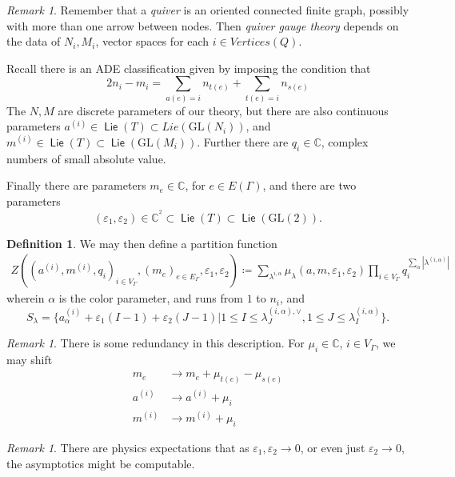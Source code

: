 \documentclass[leqno, openany]{memoir}
\theoremstyle{definition}
\newtheorem{defn}[thm]{Definition}
\theoremstyle{remark}
\newtheorem{rmk}[thm]{Remark}
\theoremstyle{plain}
\theoremstyle{definition}
\theoremstyle{remark}
\newcommand{\ep}{\varepsilon}
\newcommand{\mr}[1]{\mathrm{#1}}
\newcommand{\ms}[1]{\mathsf{#1}}
\newcommand{\GL}{\mr{GL}}
\DeclareMathOperator{\Lie}{\ms{Lie}}
\begin{document}
\begin{rmk}
Remember that a \emph{quiver} is an oriented connected finite graph, possibly with more than one arrow between nodes. 
Then \emph{quiver gauge theory} depends on the data of $N_i, M_i$, vector spaces for each $i \in Vertices(Q)$.

Recall there is an ADE classification given by imposing the condition that 
\[
2n_i - m_i = \sum_{a(e) = i} n_{t(e)} + \sum_{t(e) = i} n_{s(e)}
\]
The $N,M$ are discrete parameters of our theory, but there are also 
continuous parameters $a^{(i)} \in \Lie(T) \subset Lie(\GL(N_i))$,
and $m^{(i)} \in \Lie(T) \subset \Lie(\GL(M_i))$. 
Further there are $q_i \in \mathbb{C}$, complex numbers of small absolute value.

Finally there are parameters $m_e \in \mathbb{C}$, for $e \in E(\Gamma)$, and there are two parameters
\[
(\ep_1,\ep_2)\in \mathbb{C}^^2 \subset \Lie(T) \subset \Lie(\GL(2)).
\]
\end{rmk}

\begin{defn}
We may then define a partition function 
\begin{align*}
Z((a^{(i)},m^{(i)}, q_i)_{i \in V_\Gamma}, (m_e)_{e \in E_\Gamma},\ep_1,\ep_2) \coloneqq \sum_{\lambda^{i,\alpha}} \mu_\lambda(a,m,\ep_1,\ep_2) \prod_{i \in V_\Gamma} q_i^{\sum_\alpha |\lambda^{(i,\alpha)}|}
\end{align*}
wherein $\alpha$ is the color parameter, and runs from $1$ to $n_i$,
and 
\[
S_{\lambda} = \{ a_\alpha^{(i)} + \ep_1(I -1) + \ep_2(J-1) | 1 \leq I \leq \lambda_J^{(i,\alpha),\vee}, 1 \leq J \leq \lambda_I^{(i,\alpha)}\}.
\]
\end{defn}

\begin{rmk}
There is some redundancy in this description. For $\mu_i \in \mathbb{C}$, $i \in V_\Gamma$, we may shift
\begin{align*}
    m_e &\to m_e + \mu_{t(e)} - \mu_{s(e)}
\\
    a^{(i)} &\to a^{(i)} + \mu_i
\\
    m^{(i)} &\to m^{(i)} + \mu_i 
\end{align*}
\end{rmk}

\begin{rmk}
There are physics expectations that as $\ep_1,\ep_2 \to 0$, or even just $\ep_2 \to 0$, the asymptotics might be computable.
\end{rmk}
\end{document}
